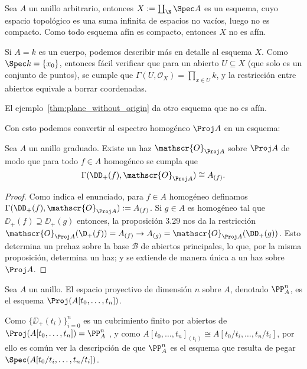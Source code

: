 \begin{ex}
	Sea $A$ un anillo arbitrario, entonces $X := \coprod_{\N} \Spec A$ es un esquema,
	cuyo espacio topológico es una suma infinita de espacios no vacíos, luego no es compacto.
	Como todo esquema afín es compacto, entonces $X$ no es afín.

	Si $A = k$ es un cuerpo, podemos describir más en detalle al esquema $X$.
	Como $\Spec k = \{ x_0 \}$, entonces fácil verificar que para un abierto $U \subseteq X$ (que solo es un conjunto de puntos),
	se cumple que $\Gamma(U, \mathscr{O}_X) = \prod_{x \in U} k$, y la restricción entre abiertos equivale a borrar coordenadas.
\end{ex}
El ejemplo~\ref{thm:plane_without_origin} da otro esquema que no es afín.

Con esto podemos convertir al espectro homogéneo $\Proj A$ en un esquema:
\begin{prop}
	Sea $A$ un anillo graduado. Existe un haz $\mathscr{O}_{\Proj A}$ sobre $\Proj A$ de modo que para todo $f \in A$ homogéneo
	se cumpla que
	$$ \Gamma(\DD_+(f), \mathscr{O}_{\Proj A}) \cong A_{(f)}. $$
\end{prop}
\begin{proof}
	Como indica el enunciado, para $f \in A$ homogéneo definamos $\Gamma(\DD_+(f ), \mathscr{O}_{\Proj A}) := A_{(f)}$.
	Si $g \in A$ es homogéneo tal que $\DD_+(f ) \supseteq \DD_+(g)$ entonces, la proposición 3.29 nos da la restricción
	$\mathscr{O}_{\Proj A}(\D_+(f )) = A_{(f)} \to A_{(g)} = \mathscr{O}_{\Proj A}(\DD_+(g))$.
	Esto determina un prehaz sobre la base $\mathcal{B}$ de abiertos principales, lo que, por la misma proposición, determina un haz;
	y se extiende de manera única a un haz sobre $\Proj A$.
\end{proof}

\begin{mydef}
	Sea $A$ un anillo.
	El espacio proyectivo de dimensión $n$ sobre $A$, denotado $\PP^n_A$, es el esquema $\Proj(A[t_0, \dots, t_n])$.
\end{mydef}
\begin{exn}
	Como $\{ \DD_+(t_i) \}^n_{i=0}$ es un cubrimiento finito por abiertos de $\Proj(A[t_0, \dots, t_n]) = \PP^n_A$ , y como
	$A[t_0, \dots, t_n]_{(t_i )} \cong A[t_0/t_i, \dots , t_n/t_i]$, por ello es común ver la descripción de que $\PP^n_A$ es el esquema
	que resulta de pegar $\Spec(A[t_0/t_i, \dots, t_n/t_i])$.
\end{exn}

